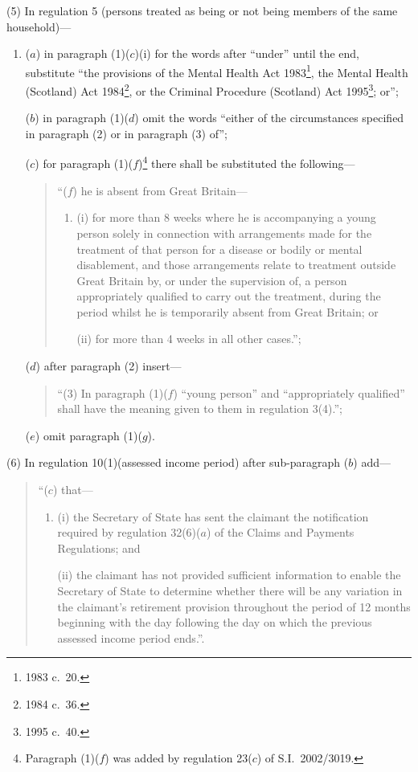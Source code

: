 \documentclass[12pt,a4paper]{article}
\begin{document}
(5) In regulation 5 (persons treated as being or not being members of the same household)—
\begin{enumerate}\item[]
($a$) in paragraph (1)($c$)(i)  for the words after “under” until the end, substitute “the provisions of the Mental Health Act 1983\footnote{1983 c.\ 20.}, the Mental Health (Scotland) Act 1984\footnote{1984 c.\ 36.}, or the Criminal Procedure (Scotland) Act 1995\footnote{1995 c.\ 40.}; or”;

($b$) in paragraph (1)($d$)  omit the words “either of the circumstances specified in paragraph (2) or in paragraph (3) of”;

($c$) for paragraph (1)($f$)\footnote{Paragraph (1)($f$) was added by regulation 23($c$) of S.I.\ 2002/3019.} there shall be substituted the following—
\begin{quotation}
“($f$) he is absent from Great Britain—
\begin{enumerate}\item[]
(i) for more than 8 weeks where he is accompanying a young person solely in connection with arrangements made for the treatment of that person for a disease or bodily or mental disablement, and those arrangements relate to treatment outside Great Britain by, or under the supervision of, a person appropriately qualified to carry out the treatment, during the period whilst he is temporarily absent from Great Britain; or

(ii) for more than 4 weeks in all other cases.”;
\end{enumerate}
\end{quotation}

($d$) after paragraph (2) insert—
\begin{quotation}
“(3) In paragraph (1)($f$)  “young person” and “appropriately qualified” shall have the meaning given to them in regulation 3(4).”;
\end{quotation}

($e$) omit paragraph (1)($g$).
\end{enumerate}

(6) In regulation 10(1)(assessed income period) after sub-paragraph ($b$)  add—
\begin{quotation}
“($c$) that—
\begin{enumerate}\item[]
(i) the Secretary of State has sent the claimant the notification required by regulation 32(6)($a$)  of the Claims and Payments Regulations; and

(ii) the claimant has not provided sufficient information to enable the Secretary of State to determine whether there will be any variation in the claimant’s retirement provision throughout the period of 12 months beginning with the day following the day on which the previous assessed income period ends.”.
\end{enumerate}
\end{quotation}
\end{document}
